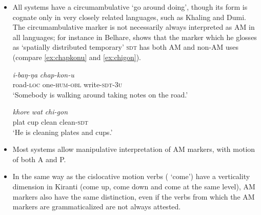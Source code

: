 \documentclass[oneside,a4paper,11pt]{article}
\newcommand{\ipa}[1]{{\phon\textit{#1}}}
\newcommand{\sens}[1]{‘#1’}
\begin{document}
\begin{itemize}
\item All systems have a circumambulative `go around doing', though its form is cognate only in very closely related languages, such as Khaling and Dumi. The circumambulative marker is not necessarily always interpreted as AM in all languages; for instance in Belhare, \citet[164]{bickel96aspect} shows that the marker which he glosses as `spatially distributed temporary' \textsc{sdt}  has both AM and non-AM uses (compare \ref{ex:chapkonu} and \ref{ex:chigon}).
 \begin{exe}
\ex \label{ex:chapkonu}
\gll \ipa{rot-de} \ipa{i-baŋ-ŋa} \ipa{chap-kon-u}  \\
road-\textsc{loc} one-\textsc{hum}-\textsc{obl} write-\textsc{sdt}-\textsc{3u} \\
\glt \sens{Somebody is walking around taking notes on the road.}
\end{exe}

 \begin{exe}
\ex \label{ex:chigon}
\gll \ipa{thali} \ipa{khore} \ipa{wat} \ipa{chi-gon}    \\
plat cup clean clean-\textsc{sdt} \\
\glt \sens{He is cleaning plates and cups.}
\end{exe}
\item Most systems allow manipulative interpretation of AM markers, with motion of both A and P.
\item In the same way as the cislocative motion verbs ( `come') have a verticality dimension in Kiranti (come up, come down and come at the same level), AM markers also have the same distinction, even if the verbs from which the AM markers are grammaticalized are not always attested.
\end{itemize}
\end{document}

